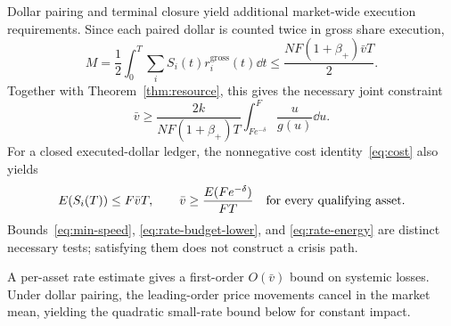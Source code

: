 \documentclass[review,hidelinks,onefignum,onetabnum]{siamonline250211}
\begin{document}
Dollar pairing and terminal closure yield additional market-wide execution requirements. Since each paired dollar is counted twice in gross share execution,
\begin{equation}\label{eq:rate-turnover}
 M=\frac12\int_0^T\sum_i S_i(t)r_i^{\mathrm{gross}}(t)\dd t
 \le\frac{NF(1+\beta_+)\bar v T}{2}.
\end{equation}
Together with Theorem~\ref{thm:resource}, this gives the necessary joint constraint
\begin{equation}\label{eq:rate-budget-lower}
 \boxed{\ \bar v\ge\frac{2k}{NF(1+\beta_+)T}
 \int_{Fe^{-\delta}}^F\frac{u}{g(u)}\dd u.\ }
\end{equation}
For a closed executed-dollar ledger, the nonnegative cost identity~\eqref{eq:cost} also yields
\begin{equation}\label{eq:rate-energy}
 E(S_i(T))\le F\bar v T,\qquad
 \bar v\ge \frac{E(Fe^{-\delta})}{FT}
 \quad \hbox{for every qualifying asset.}
\end{equation}
Bounds~\eqref{eq:min-speed}, \eqref{eq:rate-budget-lower}, and \eqref{eq:rate-energy} are distinct necessary tests; satisfying them does not construct a crisis path.

A per-asset rate estimate gives a first-order $O(\bar v)$ bound on systemic losses. Under dollar pairing, the leading-order price movements cancel in the market mean, yielding the quadratic small-rate bound below for constant impact.
\end{document}
